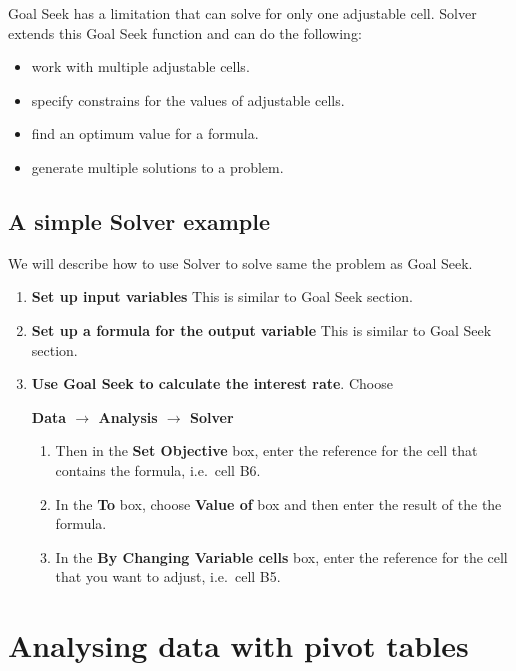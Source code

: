 \documentclass[
]{article}
\theoremstyle{definition}
\theoremstyle{definition}
\theoremstyle{definition}
\theoremstyle{definition}
\theoremstyle{remark}
\begin{document}
Goal Seek has a limitation that can solve for only one adjustable cell.
Solver extends this Goal Seek function and can do the following:

\begin{itemize}
\item
  work with multiple adjustable cells.
\item
  specify constrains for the values of adjustable cells.
\item
  find an optimum value for a formula.
\item
  generate multiple solutions to a problem.
\end{itemize}

\hypertarget{a-simple-solver-example}{%
\subsection{A simple Solver example}\label{a-simple-solver-example}}

We will describe how to use Solver to solve same the problem as Goal
Seek.

\begin{enumerate}
\def\labelenumi{\arabic{enumi}.}
\item
  \textbf{Set up input variables} This is similar to Goal Seek section.
\item
  \textbf{Set up a formula for the output variable} This is similar to Goal
  Seek section.
\item
  \textbf{Use Goal Seek to calculate the interest rate}. Choose

  \textbf{Data \(\rightarrow\) Analysis \(\rightarrow\) Solver}

  \begin{enumerate}
  \def\labelenumii{\arabic{enumii}.}
  \item
    Then in the \textbf{Set Objective} box, enter the reference for the
    cell that contains the formula, i.e.~cell B6.
  \item
    In the \textbf{To} box, choose \textbf{Value of} box and then enter the
    result of the the formula.
  \item
    In the \textbf{By Changing Variable cells} box, enter the reference
    for the cell that you want to adjust, i.e.~cell B5.
  \end{enumerate}
\end{enumerate}

\hypertarget{analysing-data-with-pivot-tables}{%
\section{Analysing data with pivot tables}\label{analysing-data-with-pivot-tables}}
\end{document}
